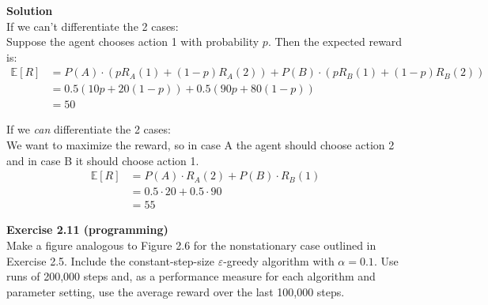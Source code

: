 \textbf{Solution}\\
If we can't differentiate the 2 cases:\\
Suppose the agent chooses action 1 with probability $p$. Then the expected reward is:
\begin{equation}
    \begin{aligned}
    \mathbb{E}[R] &= P(A) \cdot \left( p R_A(1) + (1-p)  R_A(2) \right) + 
                    P(B) \cdot \left( p R_B(1) + (1-p)  R_B(2) \right)\\
        &= 0.5 (10p + 20(1-p)) + 0.5 (90p + 80(1-p)) \\
        &= 50
    \end{aligned}
\end{equation}

If we \emph{can} differentiate the 2 cases:\\
We want to maximize the reward, so in case A the agent should choose action 2 and in case B it should choose action 1.   
\begin{equation}
    \begin{aligned}
    \mathbb{E}[R] &= P(A) \cdot R_A(2) + P(B) \cdot R_B(1) \\
        &= 0.5 \cdot 20 + 0.5 \cdot 90 \\
        &= 55
    \end{aligned}
\end{equation}


\textbf{Exercise 2.11 (programming)}\\
Make a figure analogous to Figure 2.6 for the nonstationary
case outlined in Exercise 2.5. Include the constant-step-size $\varepsilon$-greedy algorithm with
$\alpha = 0.1$. Use runs of 200,000 steps and, as a performance measure for each algorithm and
parameter setting, use the average reward over the last 100,000 steps.\\

